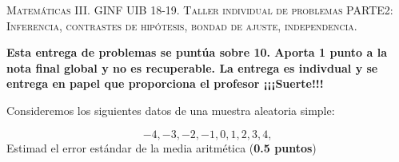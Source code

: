 \documentclass[10pt]{article}
\newcounter{problemes}
\newcounter{punts} \def\thepunts{\arabic{punts}}
\def\probl{\addtocounter{problemes}{1} \setcounter{punts}{0}
\medskip\noindent{\bf \theproblemes) }}
\begin{document}


 \vspace*{-2cm}





\begin{center}
\textsc{Matemáticas III. GINF UIB 18-19. Taller individual de problemas PARTE2: Inferencia, contrastes de hipótesis, bondad de ajuste, independencia.}
\end{center}

\textbf{Esta entrega de problemas se puntúa sobre 10. Aporta 1 punto a la nota final global y no es recuperable. La entrega es indivdual y se entrega en papel que proporciona el profesor ¡¡¡Suerte!!!}

\setcounter{problemes}{0}

\probl Consideremos los siguientes datos de una muestra aleatoria simple:

$$-4,-3,-2,-1,0,1,2,3,4,$$
Estimad el error estándar de la media aritmética (\textbf{0.5 puntos})
\end{document}
